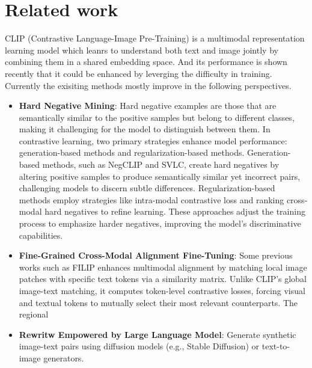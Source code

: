 \documentclass[11pt,letterpaper]{article}
\begin{document}
\section{Related work} 
CLIP (Contrastive Language-Image Pre-Training) is a multimodal representation learning model which leanrs to understand both text and image jointly by combining them in a shared embedding space. And its performance is shown recently that it could be enhanced by leverging the difficulty in training.\\
Currently the exisiting methods mostly improve in the following perspectives.\\
\begin{itemize}
    \item \textbf{Hard Negative Mining}: Hard negative examples are those that are semantically similar to the positive samples but belong to different classes, making it challenging for the model to distinguish between them. In contrastive learning, two primary strategies enhance model performance: generation-based methods and regularization-based methods. Generation-based methods, such as NegCLIP and SVLC, create hard negatives by altering positive samples to produce semantically similar yet incorrect pairs, challenging models to discern subtle differences. Regularization-based methods employ strategies like intra-modal contrastive loss and ranking cross-modal hard negatives to refine learning. These approaches adjust the training process to emphasize harder negatives, improving the model's discriminative capabilities.
    \item \textbf{Fine-Grained Cross-Modal Alignment Fine-Tuning}: Some previous works such as FILIP enhances multimodal alignment by matching local image patches with specific text tokens via a similarity matrix. Unlike CLIP’s global image-text matching, it computes token-level contrastive losses, forcing visual and textual tokens to mutually select their most relevant counterparts. The regional
    \item \textbf{Rewritw Empowered by Large Language Model}: Generate synthetic image-text pairs using diffusion models (e.g., Stable Diffusion) or text-to-image generators.
\end{itemize}
\end{document}
